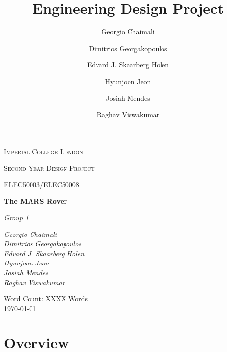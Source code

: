 \documentclass[a4paper]{article}
\title{Engineering Design Project}
\author{Georgio Chaimali \and Dimitrios Georgakopoulos \and Edvard J. Skaarberg Holen 
        \and Hyunjoon Jeon \and Josiah Mendes \and Raghav Viswakumar}
\begin{document}
 
\begin{titlepage}
    \setlength{\headheight}{66.89pt}
    \thispagestyle{fancy}
    \renewcommand{\headrulewidth}{0pt}
    \renewcommand{\footrulewidth}{0pt}
    \cfoot{} %
    \hbox{}\vfill
    \begin{center} 
	    {\scshape\LARGE Imperial College London  \par}
	    \vspace{1cm}
        {\scshape\Large Second Year Design Project\par}
        \vspace{0.25cm}
        {\scshape\Large ELEC50003/ELEC50008\par}
        \vspace{1.5cm}
        {\huge\bfseries The MARS Rover\par}
        \vspace{2cm}
        {\Large\itshape Group 1\par}
        \vfill
        \begin{flushright}
            \textsl{ \large
            Georgio Chaimali \\ Dimitrios Georgakopoulos \\ Edvard J. Skaarberg Holen 
            \\ Hyunjoon Jeon \\ Josiah Mendes \\ Raghav Viswakumar
            }
        \end{flushright}
        \vfill

        {\large Word Count: XXXX Words \\ \today\par}
    \end{center}
\end{titlepage}
 

\tableofcontents

\newpage

\section{Overview}
\end{document}
